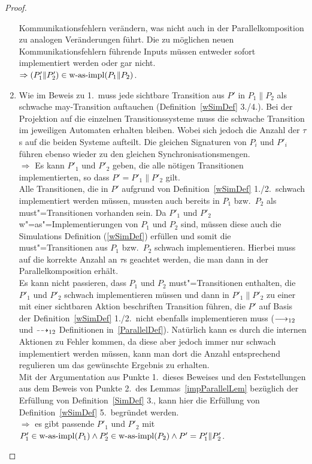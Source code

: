 \begin{proof}
\begin{enumerate}
      Kommunikationsfehlern verändern, was nicht auch in der
      Parallelkomposition zu analogen Veränderungen führt. Die zu möglichen
      neuen Kommunikationsfehlern führende Inputs müssen entweder sofort
      implementiert werden oder gar nicht.\\
      $\Rightarrow (P'_1\|P'_2)\in\mathrm{w}\text{-}\mathrm{as}\text{-}\mathrm{impl} (P_1\|P_2)$.
    \item Wie im Beweis zu 1.\ muss jede sichtbare Transition aus $P'$ in
      $P_1\|P_2$ als schwache may-Transition auftauchen
      (Definition~\ref{wSimDef} 3./4.). Bei der Projektion auf die einzelnen
      Transitionssysteme muss die schwache Transition im jeweiligen Automaten
      erhalten bleiben. Wobei sich jedoch die Anzahl der $\tau$s auf die beiden
      Systeme aufteilt. Die gleichen Signaturen von $P_i$ und $P'_i$ führen
      ebenso wieder zu den gleichen Synchronisationsmengen.\\
      $\Rightarrow$ Es kann $P'_1$ und $P'_2$ geben, die alle nötigen
      Transitionen implementierten, so dass $P'=P'_1\|P'_2$ gilt.\\
      Alle Transitionen, die in $P'$ aufgrund von Definition~\ref{wSimDef}
      1./2.\ schwach implementiert werden müssen, mussten auch bereits in $P_1$ bzw.\
      $P_2$ als must"=Transitionen vorhanden sein. Da $P'_1$ und $P'_2$
      w"=as"=Implementierungen von $P_1$ und $P_2$ sind, müssen diese auch die
      Simulations Definition (\ref{wSimDef}) erfüllen und somit die
      must"=Transitionen aus $P_1$ bzw.\ $P_2$ schwach implementieren. Hierbei
      muss auf die korrekte Anzahl an $\tau$s geachtet werden, die man dann in
      der Parallelkomposition erhält.\\
      Es kann nicht passieren, dass $P_1$ und $P_2$ must"=Transitionen
      enthalten, die $P'_1$ und $P'_2$ schwach implementieren müssen und dann
      in $P'_1\|P'_2$ zu einer mit einer sichtbaren Aktion beschriften
      Transition führen, die $P'$ auf Basis der Definition~\ref{wSimDef} 1./2.\
      nicht ebenfalls implementieren muss ($\must _{12}$ und $\may _{12}$
      Definitionen in~\ref{ParallelDef}). Natürlich kann es durch die internen
      Aktionen zu Fehler kommen, da diese aber jedoch immer nur schwach
      implementiert werden müssen, kann man dort die Anzahl entsprechend
      regulieren um das gewünschte Ergebnis zu erhalten.\\
      Mit der Argumentation aus Punkte 1.\ dieses Beweises und den
      Feststellungen aus dem Beweis von Punkte 2.\ des
      Lemmas~\ref{impParallelLem} bezüglich der Erfüllung von
      Definition~\ref{SimDef} 3., kann hier die Erfüllung von
      Definition~\ref{wSimDef} 5.\ begründet werden.\\
      $\Rightarrow$ es gibt passende $P'_1$ und $P'_2$ mit $P'_1\in\mathrm{w}\text{-}\mathrm{as}\text{-}\mathrm{impl} (P_1)
      \land P'_2\in\mathrm{w}\text{-}\mathrm{as}\text{-}\mathrm{impl} (P_2) \land P'=P'_1\|P'_2$.
  \end{enumerate}
\end{proof}

